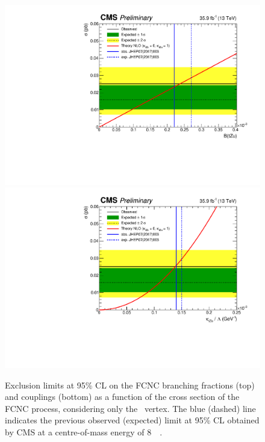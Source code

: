  \begin{figure}[htbp]
	\centering
	\includegraphics[width=0.7\linewidth]{6_Search/Figures/ExclusionPlots1D_2017_11_20/ExclusionLimit_BR_FCNC_Zut.pdf}
	\includegraphics[width=0.7\linewidth]{6_Search/Figures/ExclusionPlots1D_2017_10_25/ExclusionLimit_Kappa_FCNC_Zut.pdf}
	\caption{Exclusion limits at 95\% CL on the FCNC branching fractions (top) and couplings (bottom) as a function of the cross section of the FCNC process,  considering only the \Zut\ vertex.  The blue (dashed) line indicates the previous observed (expected) limit at 95\% CL obtained by CMS at a centre-of-mass energy of 8~\TeV~\cite{Sirunyan:2017kkr}.}
	\label{fig:exclusionlimitbrfcnczut}
\end{figure}


